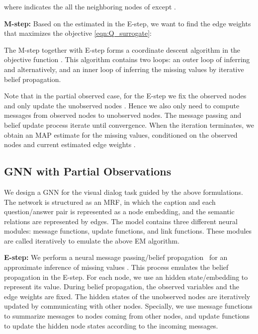 \documentclass[10pt,twocolumn,letterpaper]{article}
\begin{document}
where  indicates the all the neighboring nodes of  except .




\noindent\textbf{M-step:} Based on the estimated  in the E-step, we want to find the edge weights that maximizes the objective \autoref{eqn:Q_surrogate}:
\vspace*{-4pt}


The M-step together with E-step forms a coordinate descent algorithm in the objective function . This algorithm contains two loops: an outer loop of inferring  and  alternatively, and an inner loop of inferring the missing values  by iterative belief propagation.

Note that in the partial observed case, for the E-step we fix the observed nodes  and only update the unobserved nodes . Hence we also only need to compute messages from observed nodes to unobserved nodes. The message passing and belief update process iterate until convergence. When the iteration terminates, we obtain an MAP estimate  for the missing values, conditioned on the observed nodes  and current estimated edge weights .







\subsection{GNN with Partial Observations}\label{sec:gnn}
We design a GNN for the visual dialog task guided by the above formulations. The network is structured as an MRF, in which the caption and each question/answer pair is represented as a node embedding, and the semantic relations are represented by edges. The model contains three different neural modules: message functions, update functions, and link functions. These modules are called iteratively to emulate the above EM algorithm.

\noindent\textbf{E-step:} We perform a neural message passing/belief propagation~\cite{gilmer2017neural} for an approximate inference of missing values . This process emulates the belief propagation in the E-step. For each node, we use an hidden state/embedding to represent its value. During belief propagation, the observed variables  and the edge weights  are fixed. The hidden states of the unobserved nodes are iteratively updated by communicating with other nodes. Specially, we use message functions  to summarize messages to nodes coming from other nodes, and update functions  to update the hidden node states according to the incoming messages.
\end{document}
